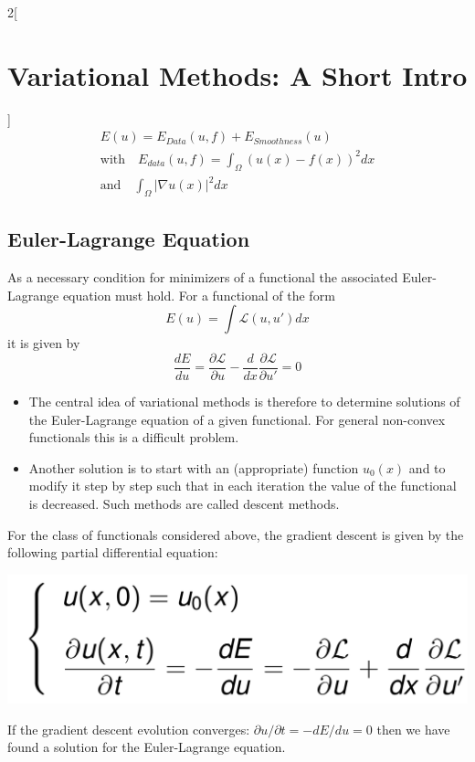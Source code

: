 \documentclass[oneside,fontsize=11pt,paper=a4]{scrartcl}
\newenvironment{myfigure}
  {\par\medskip\noindent\minipage{\linewidth}}
  {\endminipage\par\medskip}
\begin{document}
\begin{multicols}{2}[\section{Variational Methods: A Short Intro}]
\begin{equation*}
    \begin{split}
    E(u) = E_{Data}(u,f) + E_{Smoothness}(u) \quad \\ 
    \text{with} \quad E_{data}(u,f) = \int_{\Omega} (u(x)-f(x))^2 dx \\ 
    \text{and} \quad \int_{\Omega} | \nabla u(x) | ^2 dx
    \end{split}
\end{equation*}

\subsection{Euler-Lagrange Equation}
As a necessary condition for minimizers of a functional the associated Euler-Lagrange equation must hold. For a functional of the form
\begin{equation*}
    E(u) = \int \mathcal{L} (u, u') dx
\end{equation*}
it is given by 
\begin{equation*}
    \frac{dE}{du} = \frac{\partial \mathcal{L}}{\partial u} - \frac{d}{dx} \frac{\partial \mathcal{L}}{\partial u'} = 0
\end{equation*}
\begin{itemize}
    \item The central idea of variational methods is therefore to determine solutions of the Euler-Lagrange equation of a given functional. For general non-convex functionals this is a difficult problem.
    \item Another solution is to start with an (appropriate) function $u_0(x)$ and to modify it step by step such that in each iteration the value of the functional is decreased. Such methods are called descent methods.
\end{itemize}

For the class of functionals considered above, the gradient
descent is given by the following partial differential equation:
\begin{myfigure}
 \centering
 \includegraphics[width=0.7\linewidth]{Images/graddes.png}
\end{myfigure}

If the gradient descent evolution converges: $\partial u / \partial t = - dE / du = 0$
then we have found a solution for the Euler-Lagrange equation.


\end{multicols}
\end{document}

